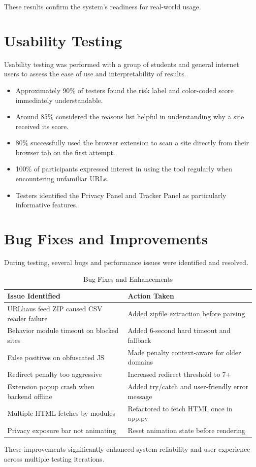 These results confirm the system's readiness for real-world usage.

\section{Usability Testing}

Usability testing was performed with a group of students and general internet users to assess the ease of use and interpretability of results.

\begin{itemize}
\item Approximately 90\% of testers found the risk label and color-coded score immediately understandable.
\item Around 85\% considered the reasons list helpful in understanding why a site received its score.
\item 80\% successfully used the browser extension to scan a site directly from their browser tab on the first attempt.
\item 100\% of participants expressed interest in using the tool regularly when encountering unfamiliar URLs.
\item Testers identified the Privacy Panel and Tracker Panel as particularly informative features.
\end{itemize}

\section{Bug Fixes and Improvements}

During testing, several bugs and performance issues were identified and resolved.

\begin{table}[H]
\centering
\begin{tabular}{|ll|}
\toprule
Issue Identified & Action Taken \\
\midrule
URLhaus feed ZIP caused CSV reader failure & Added zipfile extraction before parsing \\
Behavior module timeout on blocked sites & Added 6-second hard timeout and fallback \\
False positives on obfuscated JS & Made penalty context-aware for older domains \\
Redirect penalty too aggressive & Increased redirect threshold to 7+ \\
Extension popup crash when backend offline & Added try/catch and user-friendly error message \\
Multiple HTML fetches by modules & Refactored to fetch HTML once in app.py \\
Privacy exposure bar not animating & Reset animation state before rendering \\
\bottomrule
\end{tabular}
\caption{Bug Fixes and Enhancements}
\end{table}

These improvements significantly enhanced system reliability and user experience across multiple testing iterations.